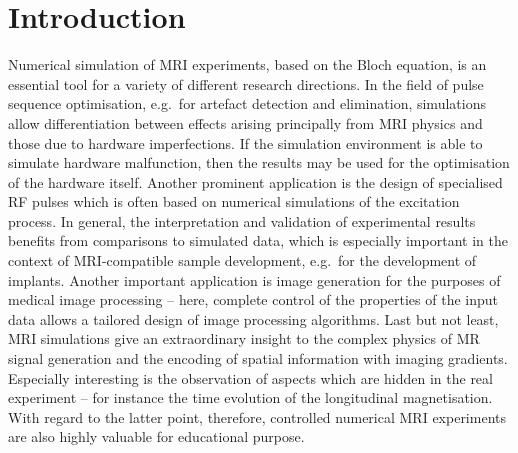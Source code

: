 \documentclass[journal,onecolumn,12pt]{IEEEtran}
\begin{document}
\section{Introduction}
Numerical simulation of MRI experiments, based on the Bloch equation, is an essential tool for a variety of different
research directions. In the field of pulse sequence optimisation, e.g.~for artefact detection and elimination,
simulations allow differentiation between effects arising principally from MRI physics and those due to hardware
imperfections. If the simulation environment is able to simulate hardware malfunction, then the results may be used for
the optimisation of the hardware itself. Another prominent application is the design of specialised RF pulses which is
often based on numerical simulations of the excitation process. In general, the interpretation and validation of
experimental results benefits from comparisons to simulated data, which is especially important in the context of
MRI-compatible sample development, e.g.~for the development of implants. Another important application is image
generation for the purposes of medical image processing -- here, complete control of the properties of the input data
allows a tailored design of image processing algorithms. Last but not least, MRI simulations give an extraordinary
insight to the complex physics of MR signal generation and the encoding of spatial information with imaging
gradients. Especially interesting is the observation of aspects which are hidden in the real experiment -- for instance
the time evolution of the longitudinal magnetisation. With regard to the latter point, therefore, controlled numerical
MRI experiments are also highly valuable for educational purpose. 
\end{document}
